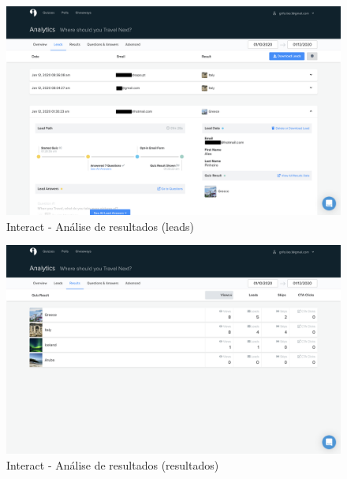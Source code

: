 \begin{figure}[ht!]
	\begin{center}
		\includegraphics[width=1\textwidth]{img/interact/data1}
		\caption{Interact - Análise de resultados (leads)}
		\label{fig:interact-data1}
	\end{center}
\end{figure}
\mbox{}
\begin{figure}[ht!]
	\begin{center}
		\includegraphics[width=1\textwidth]{img/interact/data2}
		\caption{Interact - Análise de resultados (resultados)}
		\label{fig:interact-data2}
	\end{center}
\end{figure}


